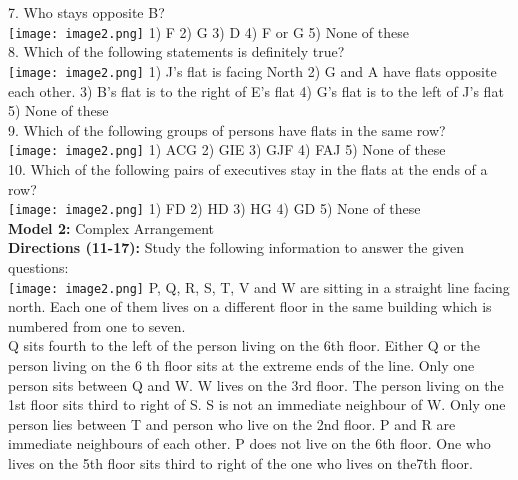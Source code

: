 \documentclass[
]{article}
\begin{document}
7. Who stays opposite B?\\
\texttt{[image: image2.png]}
1) F \hspace{2mm}2) G \hspace{2mm}3) D \hspace{2mm}4) F or G \hspace{2mm}5) None of these\\

8. Which of the following statements is definitely true?\\
\texttt{[image: image2.png]}
1) J’s flat is facing North \hspace{2mm}2) G and A have flats opposite each other.
\hspace{2mm}3) B’s flat is to the right of E’s flat \hspace{2mm}4) G’s flat is to the left of J’s flat
\hspace{2mm}5) None of these\\

9. Which of the following groups of persons have flats in the same row?\\
\texttt{[image: image2.png]}
1) ACG \hspace{2mm}2) GIE \hspace{2mm}3) GJF \hspace{2mm}4) FAJ \hspace{2mm}5) None of these\\

10. Which of the following pairs of executives stay in the flats at the ends of a row?\\
\texttt{[image: image2.png]}
1) FD \hspace{2mm}2) HD \hspace{2mm}3) HG \hspace{2mm}4) GD \hspace{2mm}5) None of these\\

\textbf{Model 2:} Complex Arrangement\\

\textbf{Directions (11-17):} Study the following information to answer the given questions:\\
\texttt{[image: image2.png]}
P, Q, R, S, T, V and W are sitting in a straight line facing north. Each one of them lives on a
different floor in the same building which is numbered from one to seven.\\
Q sits fourth to the left of the person living on the 6th floor. Either Q or the person living on the
6
th floor sits at the extreme ends of the line.
Only one person sits between Q and W. W lives on the 3rd floor. The person living on the 1st
floor sits third to right of S. S is not an immediate neighbour of W. Only one person lies between
T and person who live on the 2nd floor. P and R are immediate neighbours of each other. P does
not live on the 6th floor. One who lives on the 5th floor sits third to right of the one who lives on
the7th floor.\\
\end{document}

